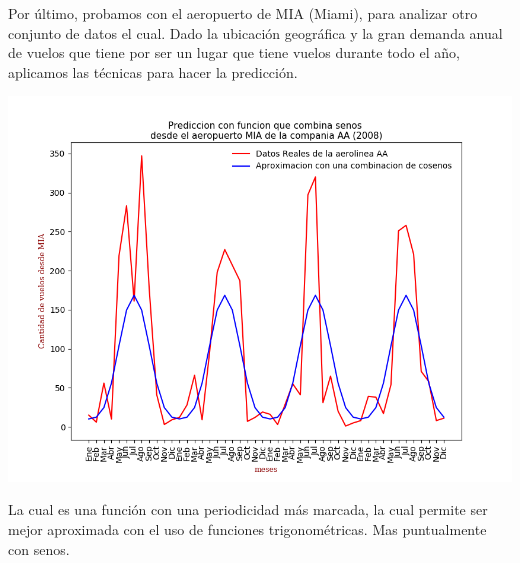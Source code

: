 \documentclass{endm}
\begin{document}
Por último, probamos con el aeropuerto de MIA (Miami), para analizar otro conjunto de datos el cual. Dado la ubicación geográfica y la gran demanda anual de vuelos que tiene por ser un lugar que tiene vuelos durante todo el año, aplicamos las técnicas para hacer la predicción.

\begin{center}
\includegraphics[scale=0.6]{imagenes/nuevas/AAMIACantSeno.png}
\end{center}
 La cual es una función con una periodicidad más marcada, la cual permite ser mejor aproximada con el uso de funciones trigonométricas. Mas puntualmente con senos.
\end{document}
